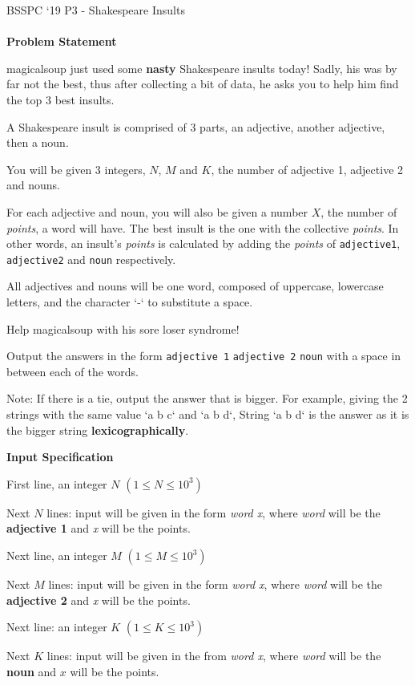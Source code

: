 \documentclass[]{article}
\begin{document}
{\Large BSSPC ‘19 P3 - Shakespeare Insults}
\\\\
\textbf{\large Problem Statement}
\par
magicalsoup just used some \textbf{nasty} Shakespeare insults today! Sadly, his was by far not the best, thus after collecting a bit of data, he asks you to help him find the top 3 best insults.
\par
A Shakespeare insult is comprised of 3 parts, an adjective, another adjective, then a noun.
\par
You will be given 3 integers, $N$, $M$ and $K$, the number of adjective 1, adjective 2 and nouns.
\par
For each adjective and noun, you will also be given a number $X$, the number of \textit{points}, a word will have. The best insult is the one with the collective \textit{points}. In other words, an insult's \textit{points} is calculated by adding the \textit{points} of \texttt{adjective1}, \texttt{adjective2} and \texttt{noun} respectively.
\par
All adjectives and nouns will be one word, composed of uppercase, lowercase letters, and the character `-` to substitute a space.
\par
Help magicalsoup with his sore loser syndrome!

Output the answers in the form \texttt{adjective 1} \texttt{adjective 2} \texttt{noun} with a space in between each of the words.

Note: If there is a tie, output the answer that is bigger. For example, giving the 2 strings with the same value `a b c` and `a b d`, String `a b d` is the answer as it is the bigger string \textbf{lexicographically}.

\textbf{\large Input Specification}
\par
First line, an integer $N$ $(1 \le N \le 10^3)$

Next $N$ lines: input will be given in the form \textit{word x}, where \textit{word} will be the \textbf{adjective 1} and \textit{x} will be the points.

Next line, an integer $M$ $(1 \le M \le 10^3)$

Next $M$ lines: input will be given in the form \textit{word x}, where \textit{word} will be the \textbf{adjective 2} and \textit{x} will be the points.

Next line: an integer $K$ $(1 \le K \le 10^3)$

Next $K$ lines: input will be given in the from \textit{word x}, where \textit{word} will be the \textbf{noun} and $x$ will be the points.
\end{document}
